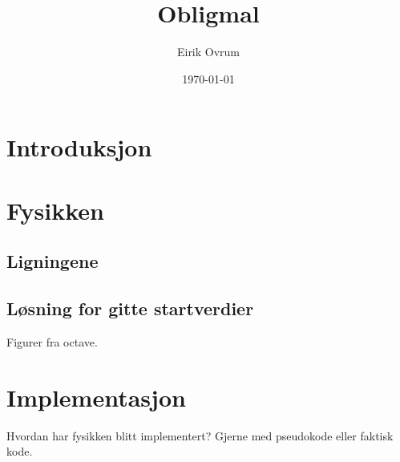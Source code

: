 \documentclass[letterpaper,12pt]{article}
\begin{document}
\title{Obligmal}
\author{Eirik Ovrum}
\date{\today}
\maketitle

\section{Introduksjon}

\section{Fysikken}

\subsection{Ligningene}

\subsection{Løsning for gitte startverdier}
Figurer fra octave.

\section{Implementasjon}
Hvordan har fysikken blitt implementert? Gjerne med pseudokode eller faktisk kode.

\cite{book}



\end{document}

